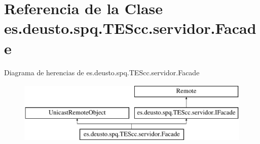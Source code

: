\hypertarget{classes_1_1deusto_1_1spq_1_1_t_e_scc_1_1servidor_1_1_facade}{\section{Referencia de la Clase es.\+deusto.\+spq.\+T\+E\+Scc.\+servidor.\+Facade}
\label{classes_1_1deusto_1_1spq_1_1_t_e_scc_1_1servidor_1_1_facade}
}
Diagrama de herencias de es.\+deusto.\+spq.\+T\+E\+Scc.\+servidor.\+Facade\begin{figure}[H]
\begin{center}
\leavevmode
\includegraphics[height=3.000000cm]{classes_1_1deusto_1_1spq_1_1_t_e_scc_1_1servidor_1_1_facade}
\end{center}
\end{figure}
